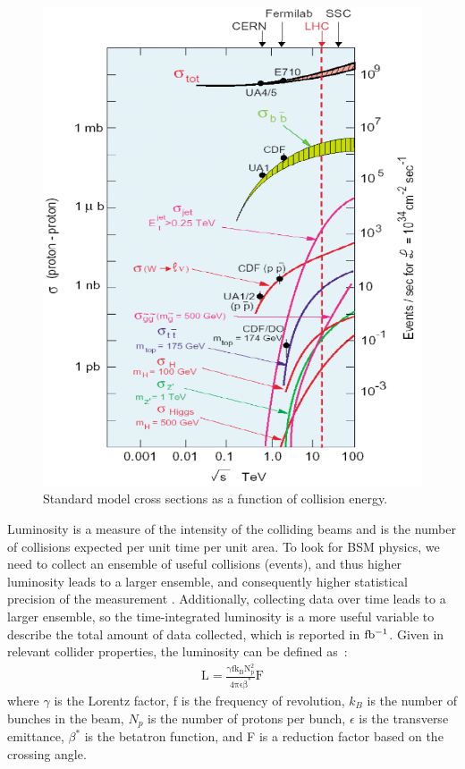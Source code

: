 \begin{figure}
\begin{center}
\includegraphics[width=0.7\linewidth]{figs/SMxsecs.png}
\caption{Standard model cross sections as a function of collision energy.}
\label{figs:SMxsecs}
\end{center}
\end{figure}


  
Luminosity is a measure of the intensity of the colliding beams and is the number of collisions expected per unit time per unit area.  
To look for BSM physics, we need to collect an ensemble of useful collisions (events), and thus higher luminosity leads to a larger 
ensemble, and consequently higher statistical precision of the measurement .  
Additionally, collecting data over time leads to a larger ensemble, so the time-integrated luminosity is a more useful variable to describe the total amount of data collected, 
which is reported in $\mathrm{fb^{-1}}$.  Given in relevant collider properties, the luminosity can be defined as~\cite{Bayatian:922757}: 
\begin{eqnarray}
\mathrm{L = \frac{\gamma f k_{B} N_{p}^{2}}{4 \pi \epsilon \beta^{*}} F}
\end{eqnarray}  
where $\gamma$ is the Lorentz factor,  f is the frequency of revolution, $k_{B}$ is the number of bunches in the beam, $N_{p}$ is the number of protons per bunch, 
$\epsilon$ is the transverse emittance, $\beta^{*}$ is the betatron function, and F is a reduction factor based on the crossing angle.  

